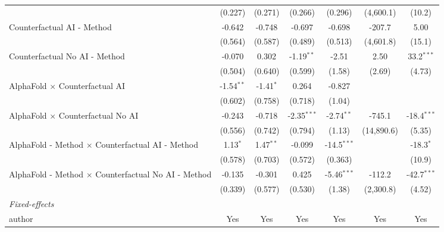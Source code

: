 \begin{tabular}{lcccccc}
                                                              & (0.227)      & (0.271)     & (0.266)       & (0.296)       & (4,600.1)  & (10.2)\\   
   Counterfactual AI - Method                                 & -0.642       & -0.748      & -0.697        & -0.698        & -207.7     & 5.00\\   
                                                              & (0.564)      & (0.587)     & (0.489)       & (0.513)       & (4,601.8)  & (15.1)\\   
   Counterfactual No AI - Method                              & -0.070       & 0.302       & -1.19$^{**}$  & -2.51         & 2.50       & 33.2$^{***}$\\   
                                                              & (0.504)      & (0.640)     & (0.599)       & (1.58)        & (2.69)     & (4.73)\\   
   AlphaFold $\times$ Counterfactual AI                       & -1.54$^{**}$ & -1.41$^{*}$ & 0.264         & -0.827        &            &   \\   
                                                              & (0.602)      & (0.758)     & (0.718)       & (1.04)        &            &   \\   
   AlphaFold $\times$ Counterfactual No AI                    & -0.243       & -0.718      & -2.35$^{***}$ & -2.74$^{**}$  & -745.1     & -18.4$^{***}$\\   
                                                              & (0.556)      & (0.742)     & (0.794)       & (1.13)        & (14,890.6) & (5.35)\\   
   AlphaFold - Method $\times$ Counterfactual AI - Method     & 1.13$^{*}$   & 1.47$^{**}$ & -0.099        & -14.5$^{***}$ &            & -18.3$^{*}$\\   
                                                              & (0.578)      & (0.703)     & (0.572)       & (0.363)       &            & (10.9)\\   
   AlphaFold - Method $\times$ Counterfactual No AI - Method  & -0.135       & -0.301      & 0.425         & -5.46$^{***}$ & -112.2     & -42.7$^{***}$\\   
                                                              & (0.339)      & (0.577)     & (0.530)       & (1.38)        & (2,300.8)  & (4.52)\\   
   \midrule
   \emph{Fixed-effects}\\
   author                                                     & Yes          & Yes         & Yes           & Yes           & Yes        & Yes\\  

\end{tabular}
